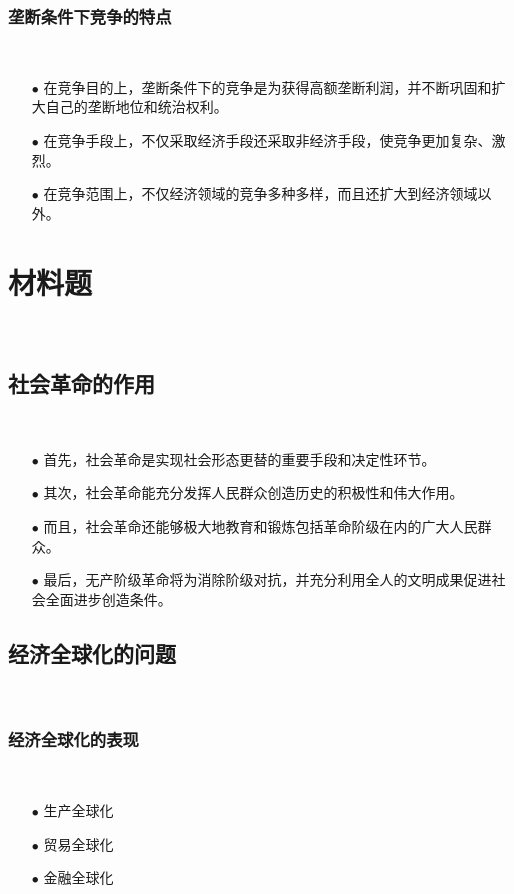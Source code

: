 \documentclass{ctexart}
\begin{document}
\subsubsection{垄断条件下竞争的特点}~{}
\vspace{-5mm}
\begin{itemize}
\item[$\bullet$]在竞争目的上，垄断条件下的竞争是为获得高额垄断利润，并不断巩固和扩大自己的垄断地位和统治权利。
\item[$\bullet$]在竞争手段上，不仅采取经济手段还采取非经济手段，使竞争更加复杂、激烈。
\item[$\bullet$]在竞争范围上，不仅经济领域的竞争多种多样，而且还扩大到经济领域以外。
\end{itemize}

\newpage
\section{材料题}~{}
\subsection{社会革命的作用}~{}
\vspace{-5mm}
\begin{itemize}
\item[$\bullet$]首先，社会革命是实现社会形态更替的重要手段和决定性环节。
\item[$\bullet$]其次，社会革命能充分发挥人民群众创造历史的积极性和伟大作用。
\item[$\bullet$]而且，社会革命还能够极大地教育和锻炼包括革命阶级在内的广大人民群众。
\item[$\bullet$]最后，无产阶级革命将为消除阶级对抗，并充分利用全人的文明成果促进社会全面进步创造条件。 
\end{itemize}

\subsection{经济全球化的问题}~{}
\vspace{-5mm}

\subsubsection{经济全球化的表现}~{}
\vspace{-5mm}
\begin{itemize}
\item[$\bullet$]生产全球化
\item[$\bullet$]贸易全球化
\item[$\bullet$]金融全球化
\end{itemize}
\end{document}
